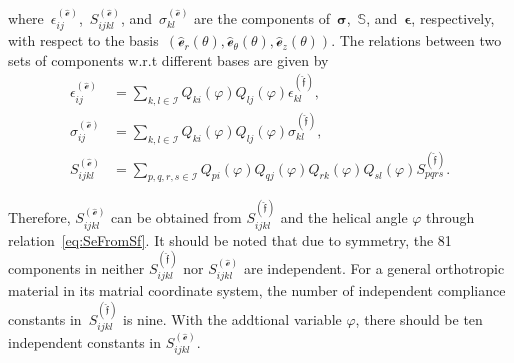 \documentclass[preprint,12pt,times]{elsarticle}
\numberwithin{equation}{section}
\newcommand{\physe}{\hat{\mathscr{e}}} %
\newcommand{\physf}{\hat{\boldsymbol{\mathfrak{f}}}}
\renewcommand{\u}[1]{\boldsymbol{#1}}
\newcommand{\usf}[1]{\u{\mathsf #1}}
\newcommand{\pr}[1]{\left( #1 \right)}
\renewcommand{\>}{$\Rightarrow$}
\begin{document}
where~$\epsilon_{ij}^{\pr{\physe}}$,~$S_{ijkl}^{\pr{\physe}}$, and~$\sigma_{kl}^{\pr{\physe}}$ are the components of~$\u{\sigma}$,~$\mathbb{S}$, and~$\u{\epsilon}$, respectively, with respect to the basis~$(\physe_{r}(\theta),\physe_{\theta}(\theta),\physe_{z}(\theta))$. The relations between two sets of components w.r.t different bases are given by
\begin{align}
\epsilon_{ij}^{\pr{\physe}} & = \sum_{k,l \in \mathcal{I}} Q_{ki} (\varphi) Q_{lj} (\varphi) \epsilon_{kl}^{\pr{\physf}} , \\
\sigma_{ij}^{\pr{\physe}} & = \sum_{k,l \in \mathcal{I}} Q_{ki}(\varphi) Q_{lj}(\varphi) \sigma_{kl}^{\pr{\physf}} , \\
S_{ijkl}^{\pr{\physe}} & = \sum_{p,q,r,s \in \mathcal{I}} Q_{pi}(\varphi) Q_{qj}(\varphi) Q_{rk}(\varphi) Q_{sl}(\varphi) S_{pqrs}^{\pr{\physf}}. \label{eq:SeFromSf}
\end{align}

Therefore, $S_{ijkl}^{\pr{\physe}}$ can be obtained from $S_{ijkl}^{\pr{\physf}}$ and the helical angle $\varphi$ through relation~\eqref{eq:SeFromSf}.
It should be noted that due to symmetry, the 81 components in neither $S_{ijkl}^{\pr{\physf}}$ nor $S_{ijkl}^{\pr{\physe}}$ are independent.
For a general orthotropic material in its matrial coordinate system, the number of independent compliance constants in~$S_{ijkl}^{\pr{\physf}}$ is nine.
With the addtional variable $\varphi$, there should be ten independent constants in $S_{ijkl}^{\pr{\physe}}$.
\end{document}
